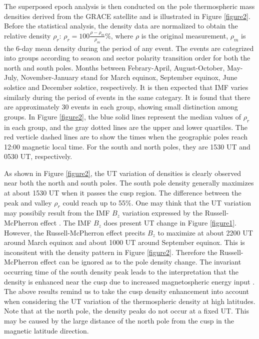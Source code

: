 \documentclass[draft, grl]{/home/guod/Documents/template/agu_template/AGUTeX}
\begin{document}
\begin{article}
    The superposed epoch analysis is then conducted on the pole thermospheric 
    mass densities derived from the GRACE satellite and is illustrated in 
    Figure \ref{figure2}.
    Before the statistical analysis, the density data are normalized to obtain 
    the relative  density $\rho_r$: $\rho_r=100\frac{\rho-\rho_m}{\rho_m}\%$, 
    where $\rho$ is the original measurement, $\rho_m$ is the 6-day mean density
    during the period of any event.
    The events are categrized into groups according to season and sector 
    polarity transition order for both the north and south poles.
    Months between Febrary-April, August-October, May-July, November-January 
    stand for March equinox, September equinox, June solstice and December 
    solstice, respectively.
    It is then expected that IMF varies similarly during the period of events
    in the same categary.
    It is found that there are approximately 30 events in each group, 
    showing small distinction among groups.
    In Figure \ref{figure2}, the blue solid lines represent the median values 
    of $\rho_r$ in each group, and the gray dotted lines are the upper and lower
    quartiles. 
    The red verticle dashed lines are to show the times when the geographic 
    poles reach 12:00 magnetic local time. 
    For the south and north poles, they are 1530 UT and 0530 UT, respectively.

    As shown in Figure \ref{figure2}, the UT variation of densities is 
    clearly observed near both the north and south poles.
    The south pole density generally maximizes at about 1530 UT when it 
    passes the cusp region. 
    The difference between the peak and valley $\rho_r$ could reach up to 55\%.
    One may think that the UT variation may possibily result from the IMF $B_z$ 
    variation expressed by the Russell-McPherron effect \citep{Russell1973}. 
    The IMF $B_z$ does present UT change in Figure \ref{figure1}. 
    However, the Russell-McPherron effect precits $B_z$ to maximize at about 
    2200 UT around March equinox and about 1000 UT around September equinox.
    This is inconsitent with the density pattern in Figure \ref{figure2}.
    Therefore the Russell-McPherron effect can be ignored as to the pole density
    change.
    The invariant occurring time of the south density peak leads to the 
    interpretation that the density is enhanced near the cusp due to increased
    magnetospheric energy input \citep{Luhr2004}.
    The above results remind us to take the cusp density enhancement into 
    account when considering the UT variation of the thermospheric density at 
    high latitudes.
    Note that at the north pole, the density peaks do not occur at a fixed UT. 
    This may be caused by the large distance of the north pole from the cusp in 
    the magnetic latitude direction.


\end{article}
\end{document}
